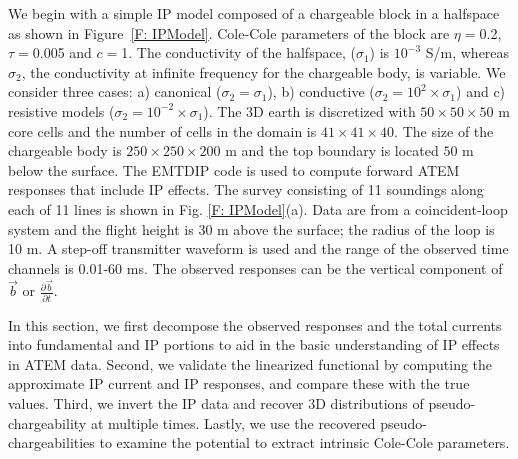 \documentclass[extra,mreferee]{gji}
\renewcommand {\b}  { {\vec b} }
\begin{document}
We begin with a simple IP model composed of a chargeable block in a halfspace as shown in Figure~\ref{F: IPModel}.
Cole-Cole parameters of the block are  $\eta=$0.2, $\tau=$0.005 and $c=$1.
The conductivity  of the halfspace, ($\sigma_1$) is  $10^{-3}$ S/m, whereas $\sigma_2$,
the conductivity at infinite frequency for the chargeable body, is variable.
We consider three cases: a) canonical ($\sigma_2=\sigma_1$), b) conductive ($\sigma_2=10^2\times\sigma_1$) and c) resistive models ($\sigma_2=10^{-2}\times\sigma_1$).
The 3D earth is discretized with  $50\times50\times50$ m core cells and the number of cells in the domain is $41\times41\times40$.
The size of the chargeable body is $250\times250\times200$ m and the top boundary is located  $50$ m below the surface.
The EMTDIP code \cite[]{Marchant2014} is used to compute forward ATEM responses that include IP effects. The survey consisting of 11 soundings along each of 11 lines is shown in Fig. \ref{F: IPModel}(a).
Data are from a  coincident-loop system and the flight height is 30 m above the surface; the radius of the loop is 10 m.
A step-off transmitter waveform is used and the range of the observed time channels is 0.01-60 ms. The observed responses can be the vertical component of $\b$ or $\frac{\partial \b}{\partial t}$.

In this section, we first decompose the observed responses and the total currents into fundamental and IP portions to aid in the basic understanding of IP effects in ATEM data.
Second, we validate the linearized functional by computing the approximate IP current and IP responses, and compare these  with the true values.
Third, we invert the IP data and recover 3D distributions of pseudo-chargeability at multiple times.  Lastly, we use the recovered pseudo-chargeabilities to examine the potential to extract intrinsic Cole-Cole parameters.


\end{document}
